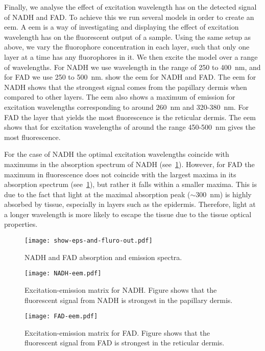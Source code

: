 Finally, we analyse the effect of excitation wavelength has on the detected signal of NADH and FAD.
To achieve this we run several models in order to create an \gls*{eem}.
A \gls*{eem} is a way of investigating and displaying the effect of excitation wavelength has on the fluorescent output of a sample.
Using the same setup as above, we vary the fluorophore concentration in each layer, such that only one layer at a time has any fluorophores in it.
We then excite the model over a range of wavelengths.
For NADH we use wavelength in the range of 250 to 400~nm, and for FAD we use 250 to 500~nm.
 show the \gls*{eem} for NADH and FAD.
The \gls*{eem} for NADH shows that the strongest signal comes from the papillary dermis when compared to other layers.
The \gls*{eem} also shows a maximum of emission for excitation wavelengths corresponding to around 260~nm and 320-380~nm.
For FAD the layer that yields the most fluorescence is the reticular dermis.
The \gls*{eem} shows that for excitation wavelengths of around the range 450-500~nm gives the most fluorescence.

For the case of NADH the optimal excitation wavelengths coincide with maximums in the absorption spectrum of NADH (see~\cref{fig:epsfluro}).
However, for FAD the maximum in fluorescence does not coincide with the largest maxima in its absorption spectrum (see~\cref{fig:epsfluro}), but rather it falls within a smaller maxima.
This is due to the fact that light at the maximal absorption peak ($\sim$300~nm) is highly absorbed by tissue, especially in layers such as the epidermis.
Therefore, light at a longer wavelength is more likely to escape the tissue due to the tissue optical properties.

\begin{figure}[!htpb]
    \centering
    \texttt{[image: show-eps-and-fluro-out.pdf]}
    \caption{NADH and FAD absorption and emission spectra.}
    \label{fig:epsfluro}
\end{figure}

\begin{figure}[!htpb]
    \centering
    \texttt{[image: NADH-eem.pdf]}
    \caption{Excitation-emission matrix for NADH. Figure shows that the fluorescent signal from NADH is strongest in the papillary dermis.}
    \label{fig:nadheem}
\end{figure}

\begin{figure}[!htpb]
    \centering
    \texttt{[image: FAD-eem.pdf]}
    \caption{Excitation-emission matrix for FAD. Figure shows that the fluorescent signal from FAD is strongest in the reticular dermis.}
    \label{fig:fadeem}
\end{figure}

